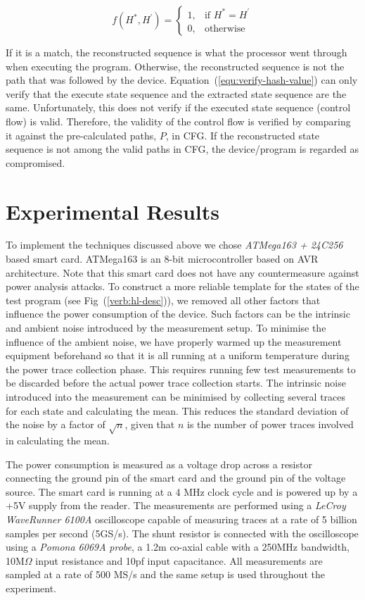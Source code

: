 \documentclass[lnicst]{svmultln}
\begin{document}
\begin{equation}
    f(H^{*}, H^{'})= 
	\begin{cases}
    1, & \text{if } H^{*} = H^{'} \\
    0, & \text{otherwise}
	\end{cases}
	\label{equ:verify-hash-value}
\end{equation}


If it is a match, the reconstructed sequence is what the processor went through when executing the program. Otherwise, the reconstructed sequence is not the path that was followed by the device. Equation~(\ref{equ:verify-hash-value}) can only verify that the execute state sequence and the extracted state sequence are the same. Unfortunately, this does not verify if the executed state sequence (control flow) is valid. Therefore, the validity of the control flow is verified by comparing it against the pre-calculated paths, $P$, in CFG. If the reconstructed state sequence is not among the valid paths in CFG, the device/program is regarded as compromised.

\section{Experimental Results}
\label{sec:experiment}

To implement the techniques discussed above we chose \emph{ATMega163 + 24C256} based smart card. ATMega163 is an 8-bit microcontroller based on AVR architecture. Note that this smart card does not have any countermeasure against power analysis attacks. To construct a more reliable template for the states of the test program (see Fig~(\ref{verb:hl-desc})), we removed all other factors that influence the power consumption of the device. Such factors can be the intrinsic and ambient noise introduced by the measurement setup. To minimise the influence of the ambient noise, we have properly warmed up the measurement equipment beforehand so that it is all running at a uniform temperature during the power trace collection phase. This requires running few test measurements to be discarded before the actual power trace collection starts. The intrinsic noise introduced into the measurement can be minimised by collecting several traces for each state and calculating the mean. This reduces the standard deviation of the noise by a factor of $\sqrt{n}$, given that $n$ is the number of power traces involved in calculating the mean.

The power consumption is measured as a voltage drop across a resistor connecting the ground pin of the smart card and the ground pin of the voltage source. The smart card is running at a 4 MHz clock cycle and is powered up by a +5V supply from the reader. The measurements are performed using a \emph{LeCroy WaveRunner 6100A} \cite{Teledyne-13} oscilloscope capable of measuring traces at a rate of 5 billion samples per second (5GS/s). The shunt resistor is connected with the oscilloscope using a \emph{Pomona 6069A} \cite{pomona-probe} \emph{probe}, a 1.2m co-axial cable with a 250MHz bandwidth, 10M$\Omega$ input resistance and 10pf input capacitance. All measurements are sampled at a rate of 500 MS/s and the same setup is used throughout the experiment.
\end{document}
